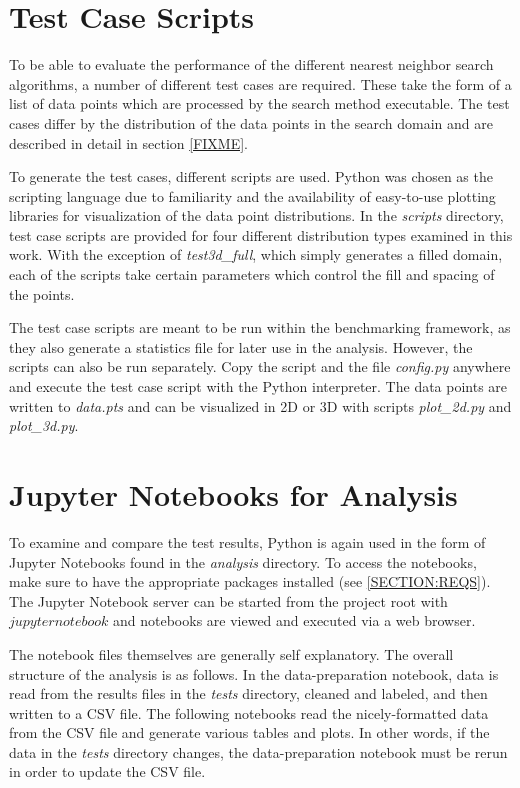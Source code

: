 \section{Test Case Scripts}
\label{SECTION:TESTCASESCRIPTS}

To be able to evaluate the performance of the different nearest neighbor search algorithms, a number of different test cases are required. These take the form of a list of data points which are processed by the search method executable. The test cases differ by the distribution of the data points in the search domain and are described in detail in section \ref{FIXME}.

To generate the test cases, different scripts are used. Python was chosen as the scripting language due to familiarity and the availability of easy-to-use plotting libraries for visualization of the data point distributions. In the {\itshape scripts} directory, test case scripts are provided for four different distribution types examined in this work. With the exception of {\itshape test3d\_full}, which simply generates a filled domain, each of the scripts take certain parameters which control the fill and spacing of the points.

The test case scripts are meant to be run within the benchmarking framework, as they also generate a statistics file for later use in the analysis. However, the scripts can also be run separately. Copy the script and the file {\itshape config.py} anywhere and execute the test case script with the Python interpreter. The data points are written to {\itshape data.pts} and can be visualized in 2D or 3D with scripts {\itshape plot\_2d.py} and {\itshape plot\_3d.py}.

\section{Jupyter Notebooks for Analysis}
\label{SECTION:NOTEBOOKS}

To examine and compare the test results, Python is again used in the form of Jupyter Notebooks found in the {\itshape analysis} directory. To access the notebooks, make sure to have the appropriate packages installed (see \ref{SECTION:REQS}). The Jupyter Notebook server can be started from the project root with $jupyter notebook$ and notebooks are viewed and executed via a web browser.

The notebook files themselves are generally self explanatory. The overall structure of the analysis is as follows. In the data-preparation notebook, data is read from the results files in the {\itshape tests} directory, cleaned and labeled, and then written to a CSV file. The following notebooks read the nicely-formatted data from the CSV file and generate various tables and plots. In other words, if the data in the {\itshape tests} directory changes, the data-preparation notebook must be rerun in order to update the CSV file.

